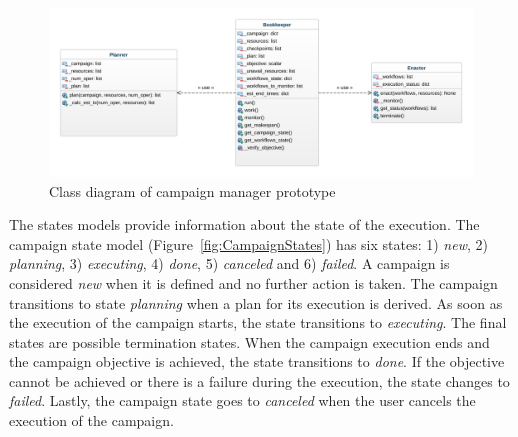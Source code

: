 \begin{figure}[t]
    \centering
    \includegraphics[width=.95\textwidth]{figures/manager/class_diagram.png}
    \caption{Class diagram of campaign manager prototype}\label{fig:rcm_class_diagram}
\end{figure}

The states models provide information about the state of the execution. The 
campaign state model (Figure~\ref{fig:CampaignStates}) has six states: 
1) \textit{new}, 2) \textit{planning}, 3) \textit{executing}, 4) \textit{done}, 
5) \textit{canceled} and 6) \textit{failed}. A campaign is considered 
\textit{new} when it is defined and no further action is taken. The campaign 
transitions to state \textit{planning} when a plan for its execution is 
derived. As soon as the execution of the campaign starts, the state 
transitions to \textit{executing}. The final states are possible termination 
states. When the campaign execution ends and the campaign objective is 
achieved, the state transitions to \textit{done}. If the objective cannot be 
achieved or there is a failure during the execution, the state changes to 
\textit{failed}. Lastly, the campaign state goes to \textit{canceled} when the 
user cancels the execution of the campaign.

